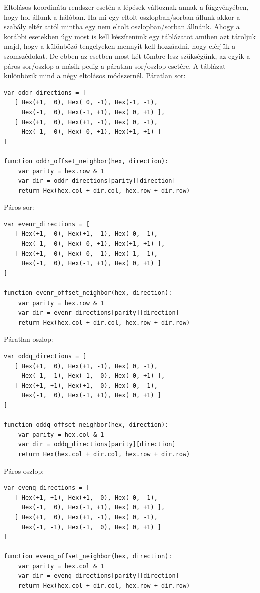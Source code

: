 \noindent Eltolásos koordináta-rendszer esetén a lépések változnak annak a függvényében, hogy hol állunk a hálóban. Ha mi egy eltolt oszlopban/sorban állunk akkor a szabály eltér attól mintha egy nem eltolt oszlopban/sorban állnánk.
\newline
\newline Ahogy a korábbi esetekben úgy most is kell készítenünk egy táblázatot amiben azt tároljuk majd, hogy a különböző tengelyeken mennyit kell hozzáadni, hogy elérjük a szomszédokat. De ebben az esetben most két tömbre lesz szükségünk, az egyik a páros sor/oszlop a másik pedig a páratlan sor/oszlop esetére.
\newline
\newline A táblázat különbözik mind a négy eltolásos módszernél.
\newline
\newline Páratlan sor: 
\begin{verbatim}
var oddr_directions = [
   [ Hex(+1,  0), Hex( 0, -1), Hex(-1, -1),
     Hex(-1,  0), Hex(-1, +1), Hex( 0, +1) ],
   [ Hex(+1,  0), Hex(+1, -1), Hex( 0, -1),
     Hex(-1,  0), Hex( 0, +1), Hex(+1, +1) ]
]

function oddr_offset_neighbor(hex, direction):
    var parity = hex.row & 1
    var dir = oddr_directions[parity][direction]
    return Hex(hex.col + dir.col, hex.row + dir.row)
\end{verbatim}
Páros sor: 
\begin{verbatim}
var evenr_directions = [
   [ Hex(+1,  0), Hex(+1, -1), Hex( 0, -1),
     Hex(-1,  0), Hex( 0, +1), Hex(+1, +1) ],
   [ Hex(+1,  0), Hex( 0, -1), Hex(-1, -1),
     Hex(-1,  0), Hex(-1, +1), Hex( 0, +1) ]
]

function evenr_offset_neighbor(hex, direction):
    var parity = hex.row & 1
    var dir = evenr_directions[parity][direction]
    return Hex(hex.col + dir.col, hex.row + dir.row)
\end{verbatim}
Páratlan oszlop: 
\begin{verbatim}
var oddq_directions = [
   [ Hex(+1,  0), Hex(+1, -1), Hex( 0, -1),
     Hex(-1, -1), Hex(-1,  0), Hex( 0, +1) ],
   [ Hex(+1, +1), Hex(+1,  0), Hex( 0, -1),
     Hex(-1,  0), Hex(-1, +1), Hex( 0, +1) ]
]

function oddq_offset_neighbor(hex, direction):
    var parity = hex.col & 1
    var dir = oddq_directions[parity][direction]
    return Hex(hex.col + dir.col, hex.row + dir.row)
\end{verbatim}
Páros oszlop: 
\begin{verbatim}
var evenq_directions = [
   [ Hex(+1, +1), Hex(+1,  0), Hex( 0, -1),
     Hex(-1,  0), Hex(-1, +1), Hex( 0, +1) ],
   [ Hex(+1,  0), Hex(+1, -1), Hex( 0, -1),
     Hex(-1, -1), Hex(-1,  0), Hex( 0, +1) ]
]

function evenq_offset_neighbor(hex, direction):
    var parity = hex.col & 1
    var dir = evenq_directions[parity][direction]
    return Hex(hex.col + dir.col, hex.row + dir.row)
\end{verbatim}

